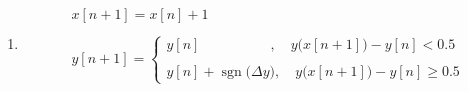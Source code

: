 \documentclass{article}
\DeclareMathOperator{\sgn}{sgn}
\begin{document}
\begin{enumerate}
    \item \begin{align*}
                &x[n + 1] = x[n] + 1 \\ \\ 
                &y[n + 1] = \begin{cases}
                                y[n] \quad \quad \quad \quad \quad, \quad y\big(x[n + 1]\big) - y[n] < 0.5 \\ \\
                                y[n] + \sgn\big(\Delta y\big), \quad y\big(x[n + 1]\big) - y[n] \geq 0.5 
                              \end{cases} 
            \end{align*}
\end{enumerate}
\end{document}

